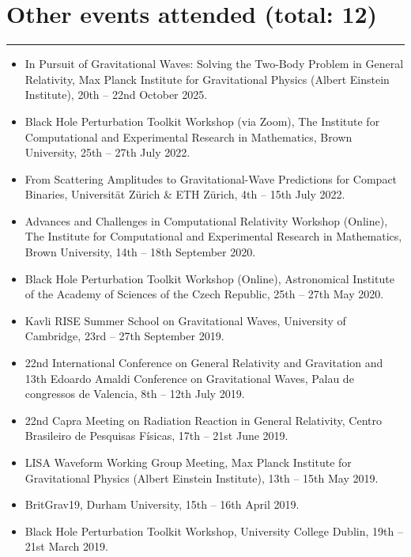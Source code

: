 \documentclass[10.5pt, oneside]{article}   	%
\begin{document}
 \newpage
{\color{Sectioncolour}
\section*{Other events attended {\rm (total: 12)}}
\vspace{-3mm}
\noindent\rule{\linewidth}{0.6pt}}
\begin{itemize}
\item In Pursuit of Gravitational Waves: Solving the Two-Body Problem in General Relativity,  Max Planck Institute for Gravitational Physics (Albert Einstein Institute), 20th -- 22nd October 2025.
\item Black Hole Perturbation Toolkit Workshop (via Zoom), The Institute for Computational and Experimental Research in Mathematics, Brown University, 25th -- 27th July 2022.
\item From Scattering Amplitudes to Gravitational-Wave Predictions for Compact Binaries, Universität Zürich \& ETH Zürich, 4th -- 15th July 2022.
\item Advances and Challenges in Computational Relativity Workshop (Online), The Institute for Computational and Experimental Research in Mathematics, Brown University, 14th -- 18th September 2020.
\item Black Hole Perturbation Toolkit Workshop (Online), Astronomical Institute of the Academy of Sciences of the Czech Republic, 25th -- 27th May 2020.
\item Kavli RISE Summer School on Gravitational Waves, University of Cambridge, 23rd -- 27th September 2019.
\item 22nd International Conference on General Relativity and Gravitation and 13th Edoardo Amaldi Conference on Gravitational Waves, Palau de congressos de Valencia, 8th -- 12th July 2019.
\item 22nd Capra Meeting on Radiation Reaction in General Relativity, Centro Brasileiro de Pesquisas Físicas, 17th -- 21st June 2019.
\item LISA Waveform Working Group Meeting, Max Planck Institute for Gravitational Physics (Albert Einstein Institute), 13th -- 15th May 2019.
\item BritGrav19, Durham University, 15th -- 16th April 2019.
\item Black Hole Perturbation Toolkit Workshop, University College Dublin, 19th -- 21st March 2019.
\end{itemize} 
\end{document}
